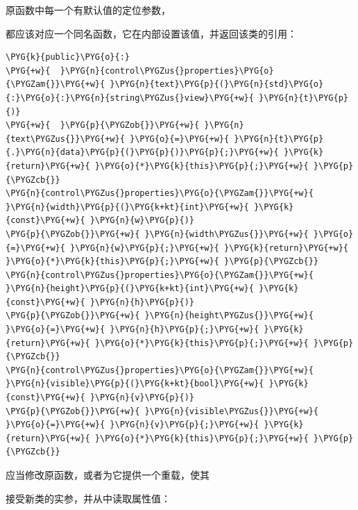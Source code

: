 
原函数中每一个有默认值的定位参数，



都应该对应一个同名函数，它在内部设置该值，并返回该类的引用：



\begin{codeblockbg}
\begin{Verbatim}[commandchars=\\\{\},breaklines=true,breakanywhere=true,fontsize=\codefont,xleftmargin=17bp]
\PYG{k}{public}\PYG{o}{:}
\PYG{+w}{  }\PYG{n}{control\PYGZus{}properties}\PYG{o}{\PYGZam{}}\PYG{+w}{ }\PYG{n}{text}\PYG{p}{(}\PYG{n}{std}\PYG{o}{:}\PYG{o}{:}\PYG{n}{string\PYGZus{}view}\PYG{+w}{ }\PYG{n}{t}\PYG{p}{)}
\PYG{+w}{  }\PYG{p}{\PYGZob{}}\PYG{+w}{ }\PYG{n}{text\PYGZus{}}\PYG{+w}{ }\PYG{o}{=}\PYG{+w}{ }\PYG{n}{t}\PYG{p}{.}\PYG{n}{data}\PYG{p}{(}\PYG{p}{)}\PYG{p}{;}\PYG{+w}{ }\PYG{k}{return}\PYG{+w}{ }\PYG{o}{*}\PYG{k}{this}\PYG{p}{;}\PYG{+w}{ }\PYG{p}{\PYGZcb{}}
\PYG{n}{control\PYGZus{}properties}\PYG{o}{\PYGZam{}}\PYG{+w}{ }\PYG{n}{width}\PYG{p}{(}\PYG{k+kt}{int}\PYG{+w}{ }\PYG{k}{const}\PYG{+w}{ }\PYG{n}{w}\PYG{p}{)}
\PYG{p}{\PYGZob{}}\PYG{+w}{ }\PYG{n}{width\PYGZus{}}\PYG{+w}{ }\PYG{o}{=}\PYG{+w}{ }\PYG{n}{w}\PYG{p}{;}\PYG{+w}{ }\PYG{k}{return}\PYG{+w}{ }\PYG{o}{*}\PYG{k}{this}\PYG{p}{;}\PYG{+w}{ }\PYG{p}{\PYGZcb{}}
\PYG{n}{control\PYGZus{}properties}\PYG{o}{\PYGZam{}}\PYG{+w}{ }\PYG{n}{height}\PYG{p}{(}\PYG{k+kt}{int}\PYG{+w}{ }\PYG{k}{const}\PYG{+w}{ }\PYG{n}{h}\PYG{p}{)}
\PYG{p}{\PYGZob{}}\PYG{+w}{ }\PYG{n}{height\PYGZus{}}\PYG{+w}{ }\PYG{o}{=}\PYG{+w}{ }\PYG{n}{h}\PYG{p}{;}\PYG{+w}{ }\PYG{k}{return}\PYG{+w}{ }\PYG{o}{*}\PYG{k}{this}\PYG{p}{;}\PYG{+w}{ }\PYG{p}{\PYGZcb{}}
\PYG{n}{control\PYGZus{}properties}\PYG{o}{\PYGZam{}}\PYG{+w}{ }\PYG{n}{visible}\PYG{p}{(}\PYG{k+kt}{bool}\PYG{+w}{ }\PYG{k}{const}\PYG{+w}{ }\PYG{n}{v}\PYG{p}{)}
\PYG{p}{\PYGZob{}}\PYG{+w}{ }\PYG{n}{visible\PYGZus{}}\PYG{+w}{ }\PYG{o}{=}\PYG{+w}{ }\PYG{n}{v}\PYG{p}{;}\PYG{+w}{ }\PYG{k}{return}\PYG{+w}{ }\PYG{o}{*}\PYG{k}{this}\PYG{p}{;}\PYG{+w}{ }\PYG{p}{\PYGZcb{}}
\end{Verbatim}
\end{codeblockbg}



应当修改原函数，或者为它提供一个重载，使其



接受新类的实参，并从中读取属性值：



